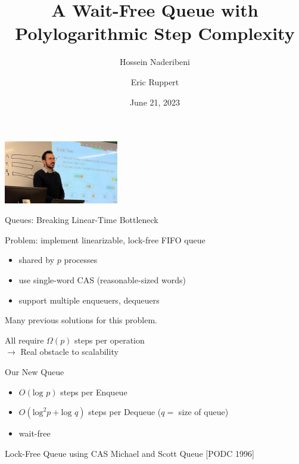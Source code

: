 \documentclass[compress]{beamer}
\title{A Wait-Free Queue with\\
Polylogarithmic Step Complexity}
\author{Hossein Naderibeni \and Eric Ruppert}
\date{June 21, 2023}
\newcommand{\op}[1]{\mbox{\sc #1}}
\renewcommand{\log}{\mbox{log }} %
\begin{document}
\begin{frame}
\maketitle
\hspace*{29mm}\includegraphics[width=5cm]{Hossein.jpeg}

\end{frame}


\begin{frame}{Queues:  Breaking Linear-Time Bottleneck}

Problem:  implement linearizable, lock-free FIFO queue
\begin{itemize}
\item shared by $p$ processes
\item use single-word CAS (reasonable-sized words)
\item support multiple enqueuers, dequeuers
\end{itemize}

\medskip
\pause

Many previous solutions for this problem.

\medskip

All require $\Omega(p)$ steps per operation\\
$\rightarrow$ Real obstacle to scalability

\pause
\begin{block}{Our New Queue}
\begin{itemize}
\item $O(\log p)$ steps per \op{Enqueue}
\item $O(\mbox{log}^2 p + \log q)$ steps per \op{Dequeue} ($q=$ size of queue)
\item wait-free
\end{itemize}
\end{block}


\end{frame}


\begin{frame}{Lock-Free Queue using CAS}
Michael and Scott Queue [PODC 1996]

\bigskip


\only<2>{}%
\only<3>{}%
\end{frame}
\end{document}
